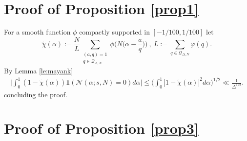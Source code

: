 \documentclass[12pt,reqno]{amsart}
\theoremstyle{plain}
\numberwithin{equation}{section}
\numberwithin{figure}{section}
\theoremstyle{plain}
\theoremstyle{definition}
\theoremstyle{remark}
\begin{document}
\section{Proof of Proposition \ref{prop1}}

For a smooth function $\phi$ compactly supported in $[-1 / 100, 1 / 100]$ let 
$$
\widetilde{\chi}(\alpha) := 
\frac{N}{L}
  \sum_{\substack{(a,q) = 1 \\ q \in \mathcal{Q}_{\Delta, N}}} 
  \phi \Big ( N 
  \Big ( \alpha - \frac{a}{q} \Big ) \Big ) \ , 
  \ L := \sum_{q \in \mathcal{Q}_{\Delta, N}} \varphi(q). 
  $$
By Lemma \ref{le:mayank} 
\begin{align*}
\Big | \int_{0}^{1} (1 - \widetilde{\chi}(\alpha) ) 
\mathbf{1} ( \mathcal{N}(\alpha; s, N) = 0 ) 
d \alpha \Big | \leq \Big ( \int_{0}^{1} |1 - \widetilde{\chi}(\alpha) |^2 d \alpha \Big )^{1/2}
\ll \frac{1}{\Delta^{1/2}}.
\end{align*}
concluding the proof. %

\section{Proof of Proposition \ref{prop3}}
\end{document}
